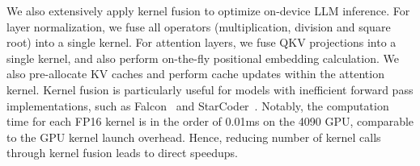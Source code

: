  We also extensively apply kernel fusion to optimize on-device LLM inference. For layer normalization, we fuse all operators (\eg multiplication, division and square root) into a single kernel. For attention layers, we fuse QKV projections into a single kernel, and also perform on-the-fly positional embedding calculation. We also pre-allocate KV caches and perform cache updates within the attention kernel. Kernel fusion is particularly useful for models with inefficient forward pass implementations, such as Falcon~\cite{penedo2023refinedweb} and StarCoder~\cite{li2023starcoder}. Notably, the computation time for each FP16 kernel is in the order of 0.01ms on the 4090 GPU, comparable to the GPU kernel launch overhead. Hence, reducing number of kernel calls through kernel fusion leads to direct speedups.






